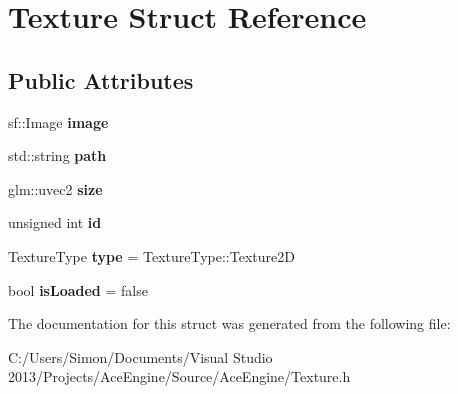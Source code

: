 \hypertarget{struct_texture}{}\section{Texture Struct Reference}
\label{struct_texture}
\subsection*{Public Attributes}
\begin{DoxyCompactItemize}
\item 
\hypertarget{struct_texture_aca5a94887081662571f71c113a50da90}{}sf\+::\+Image {\bfseries image}\label{struct_texture_aca5a94887081662571f71c113a50da90}

\item 
\hypertarget{struct_texture_aa8ba4ade408b0df1fc9b6f605a4efd22}{}std\+::string {\bfseries path}\label{struct_texture_aa8ba4ade408b0df1fc9b6f605a4efd22}

\item 
\hypertarget{struct_texture_ab1c2077cdc453d9a42505975d1cd4daa}{}glm\+::uvec2 {\bfseries size}\label{struct_texture_ab1c2077cdc453d9a42505975d1cd4daa}

\item 
\hypertarget{struct_texture_aed42161a5c00b6020c85833401da6da6}{}unsigned int {\bfseries id}\label{struct_texture_aed42161a5c00b6020c85833401da6da6}

\item 
\hypertarget{struct_texture_ad83ed086abaa805a606a5ccd433f505c}{}Texture\+Type {\bfseries type} = Texture\+Type\+::\+Texture2\+D\label{struct_texture_ad83ed086abaa805a606a5ccd433f505c}

\item 
\hypertarget{struct_texture_a0f7ade2abc1ccc6611e9beba8e94c1d9}{}bool {\bfseries is\+Loaded} = false\label{struct_texture_a0f7ade2abc1ccc6611e9beba8e94c1d9}

\end{DoxyCompactItemize}


The documentation for this struct was generated from the following file\+:\begin{DoxyCompactItemize}
\item 
C\+:/\+Users/\+Simon/\+Documents/\+Visual Studio 2013/\+Projects/\+Ace\+Engine/\+Source/\+Ace\+Engine/Texture.\+h\end{DoxyCompactItemize}
